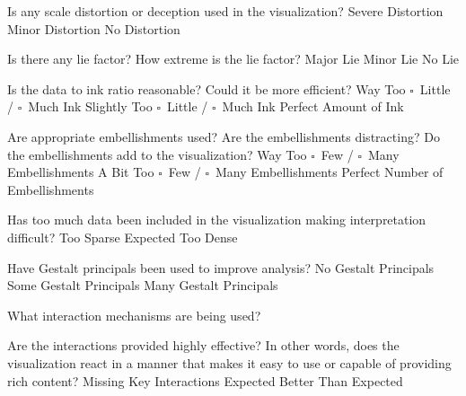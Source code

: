 \documentclass[a4paper,12pt]{article}
\begin{document}
        
\EndTable  



	{Is any scale distortion or deception used in the visualization?}	
	{\choice Severe Distortion}
	{\choice Minor Distortion}
	{\choice No Distortion} 
        
	{Is there any lie factor? How extreme is the lie factor?}
	{\choice Major Lie}
	{\choice Minor Lie}
	{\choice No Lie} 

	{Is the data to ink ratio reasonable? Could it be more efficient?}
	{Way Too $\square$~Little / $\square$~Much Ink}
	{Slightly Too $\square$~Little / $\square$~Much Ink}
	{\choice Perfect Amount of Ink} 
        
	{Are appropriate embellishments used? Are the embellishments 
    	distracting? Do the embellishments add to the visualization?}
	{Way Too $\square$~Few / $\square$~Many Embellishments}
	{A Bit Too $\square$~Few / $\square$~Many Embellishments}
	{\choice Perfect Number of Embellishments} 
        
	{Has too much data been included in the visualization making 
    	interpretation difficult? } 
	{\choice Too Sparse}
	{\choice Expected}
	{\choice Too Dense} 
        
	{Have Gestalt principals been used to improve analysis?}
	{\choice No Gestalt Principals}
	{\choice Some Gestalt Principals}
	{\choice Many Gestalt Principals} 
        
\EndTable  
 
        
\vspace{15pt}   
 

   	{What interaction mechanisms are being used?}
    {
    }
        
	{Are the interactions provided highly effective? In other words, does 
    	the visualization react in a manner that makes it easy to use or 
        capable of providing rich content?}
    {\choice Missing Key Interactions}
    {\choice Expected}
    {\choice Better Than Expected}
    
\EndTable
\end{document}
